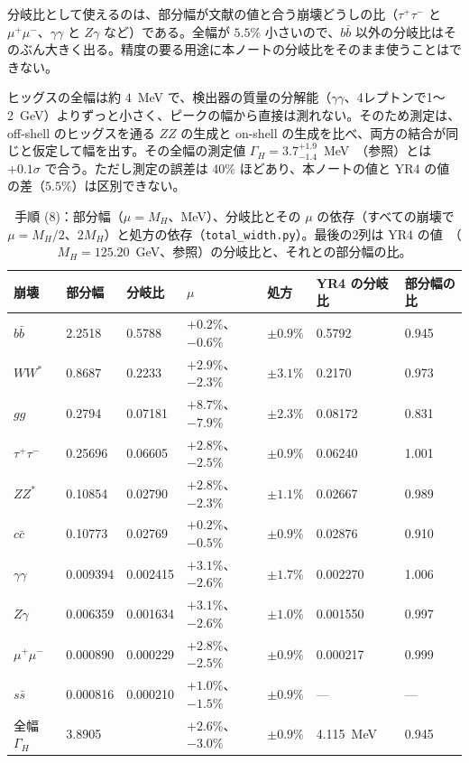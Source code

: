 \documentclass[a4paper,10pt]{ltjsarticle}
\begin{document}
分岐比として使えるのは、部分幅が文献の値と合う崩壊どうしの比（$\tau^+\tau^-$ と $\mu^+\mu^-$、$\gamma\gamma$ と $Z\gamma$ など）である。全幅が $5.5\%$ 小さいので、$b\bar b$ 以外の分岐比はそのぶん大きく出る。精度の要る用途に本ノートの分岐比をそのまま使うことはできない。

ヒッグスの全幅は約 $4$~MeV で、検出器の質量の分解能（$\gamma\gamma$、4レプトンで1〜2~GeV）よりずっと小さく、ピークの幅から直接は測れない。そのため測定は、off-shell のヒッグスを通る $ZZ$ の生成と on-shell の生成を比べ、両方の結合が同じと仮定して幅を出す。その全幅の測定値 $\Gamma_H=3.7^{+1.9}_{-1.4}$~MeV~\cite{pdg24}（参照）とは $+0.1\sigma$ で合う。ただし測定の誤差は $40\%$ ほどあり、本ノートの値と YR4 の値の差（$5.5\%$）は区別できない。

\begin{table}[tbp]
\centering\small
\caption{手順 (8)：部分幅（$\mu=M_H$、MeV）、分岐比とその $\mu$ の依存（すべての崩壊で $\mu=M_H/2$、$2M_H$）と処方の依存（\texttt{total\_width.py}）。最後の2列は YR4 の値~\cite{yr4}（$M_H=125.20$~GeV、参照）の分岐比と、それとの部分幅の比。}
\label{tab:total}
\footnotesize\setlength{\tabcolsep}{4pt}
\begin{tabular}{lllllll}
\toprule
崩壊 & 部分幅 & 分岐比 & $\mu$ & 処方 & YR4 の分岐比 & 部分幅の比 \\
\midrule
$b\bar b$ & 2.2518 & 0.5788 & $+0.2\%$、$-0.6\%$ & $\pm0.9\%$ & 0.5792 & 0.945 \\
$WW^*$ & 0.8687 & 0.2233 & $+2.9\%$、$-2.3\%$ & $\pm3.1\%$ & 0.2170 & 0.973 \\
$gg$ & 0.2794 & 0.07181 & $+8.7\%$、$-7.9\%$ & $\pm2.3\%$ & 0.08172 & 0.831 \\
$\tau^+\tau^-$ & 0.25696 & 0.06605 & $+2.8\%$、$-2.5\%$ & $\pm0.9\%$ & 0.06240 & 1.001 \\
$ZZ^*$ & 0.10854 & 0.02790 & $+2.8\%$、$-2.3\%$ & $\pm1.1\%$ & 0.02667 & 0.989 \\
$c\bar c$ & 0.10773 & 0.02769 & $+0.2\%$、$-0.5\%$ & $\pm0.9\%$ & 0.02876 & 0.910 \\
$\gamma\gamma$ & 0.009394 & 0.002415 & $+3.1\%$、$-2.6\%$ & $\pm1.7\%$ & 0.002270 & 1.006 \\
$Z\gamma$ & 0.006359 & 0.001634 & $+3.1\%$、$-2.6\%$ & $\pm1.0\%$ & 0.001550 & 0.997 \\
$\mu^+\mu^-$ & 0.000890 & 0.000229 & $+2.8\%$、$-2.5\%$ & $\pm0.9\%$ & 0.000217 & 0.999 \\
$s\bar s$ & 0.000816 & 0.000210 & $+1.0\%$、$-1.5\%$ & $\pm0.9\%$ & — & — \\
\midrule
全幅 $\Gamma_H$ & 3.8905 & & $+2.6\%$、$-3.0\%$ & $\pm0.9\%$ & 4.115~MeV & 0.945 \\
\bottomrule
\end{tabular}
\end{table}
\end{document}
